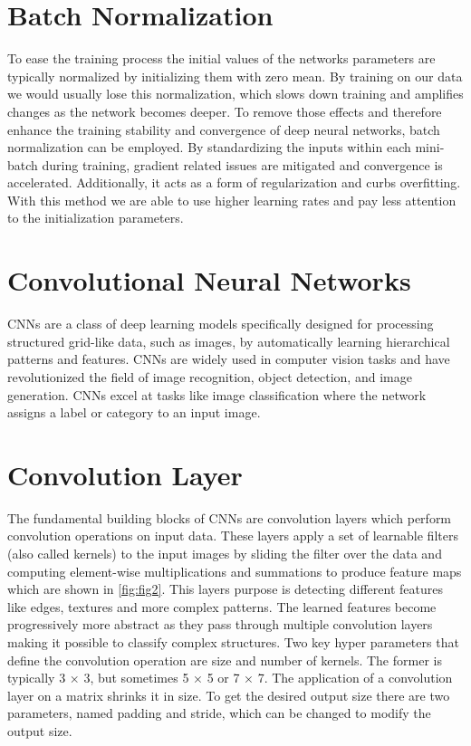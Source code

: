 \documentclass[
a4paper, 
12pt,
grayscalebody, %
abstract=on,
twoside, BCOR10mm, 12pt, DIV13,headinclude, footexclude, final, abstracton, openright
]{ibireprt}
\numberwithin{equation}{chapter}
\numberwithin{table}{chapter}
\numberwithin{figure}{chapter}
\numberwithin{algorithm}{chapter}
\numberwithin{example}{chapter}
\numberwithin{example}{chapter}
\begin{document}
\section{Batch Normalization}
To ease the training process the initial values of the networks parameters are typically normalized by initializing them with zero mean. By training on our data we would usually lose this normalization, which slows down training and amplifies changes as the network becomes deeper. To remove those effects and therefore enhance the training stability and convergence of deep neural networks, batch normalization can be employed. \cite{Ioffe2015} By standardizing the inputs within each mini-batch during training, gradient related issues are mitigated and convergence is  accelerated. Additionally, it acts as a form of regularization and curbs overfitting. With this method we are able to use higher learning rates and pay less attention to the initialization parameters. \cite{Ruder2016} 


\section{Convolutional Neural Networks}
CNNs are a class of deep learning models specifically designed for processing structured grid-like data, such as images, by automatically learning hierarchical patterns and features. CNNs are widely used in computer vision tasks and have revolutionized the field of image recognition, object detection, and image generation. CNNs excel at tasks like image classification where the network assigns a label or category to an input image.

\section{Convolution Layer}
The fundamental building blocks of CNNs are convolution layers which perform convolution operations on input data. These layers apply a set of learnable filters (also called kernels) to the input images by sliding the filter over the data and computing element-wise multiplications and summations to produce feature maps which are shown in \ref{fig:fig2}. This layers purpose is detecting different features like edges, textures and more complex patterns. The learned features become progressively more abstract as they pass through multiple convolution layers making it possible to classify complex structures. Two key hyper parameters that define the convolution operation are size and number of kernels. The former is typically 3 × 3, but sometimes 5 × 5 or 7 × 7. The application of a convolution layer on a matrix shrinks it in size. To get the desired output size there are two parameters, named padding and stride, which can be changed to modify the output size. 
 
\end{document}
